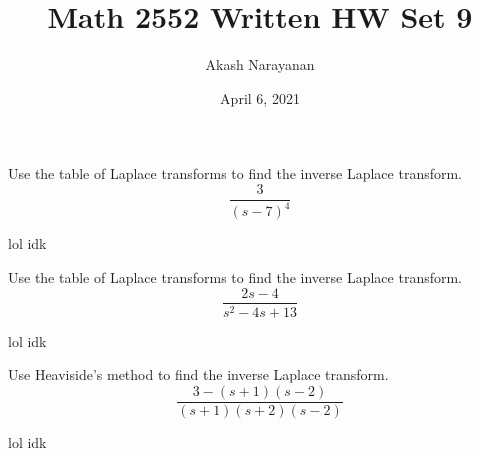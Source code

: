 \documentclass[11pt, titlepage]{article}
\title{Math 2552 Written HW Set 9}
\author{Akash Narayanan}
\date{April 6, 2021}
\begin{document}
    \maketitle

    \begin{problem}[Trench 8.2.1a]
        Use the table of Laplace transforms to find the inverse Laplace
        transform.
        \[
            \frac{3}{(s-7)^{4}}
        \]
    \end{problem}

    \begin{solution}
        lol idk
    \end{solution}

    \pagebreak

    \begin{problem}[Trench 8.2.1b] 
        Use the table of Laplace transforms to find the inverse Laplace
        transform.
        \[
            \frac{2s - 4}{s^2 - 4s + 13}
        \]
    \end{problem}

    \begin{solution}
        lol idk
    \end{solution}

    \pagebreak

    \begin{problem}[Trench 8.2.3a]
        Use Heaviside's method to find the inverse Laplace transform.
        \[
            \frac{3 - (s + 1)(s - 2)}{(s + 1)(s + 2)(s - 2)}
        \]
    \end{problem}

    \begin{solution}
        lol idk
    \end{solution}
\end{document}
